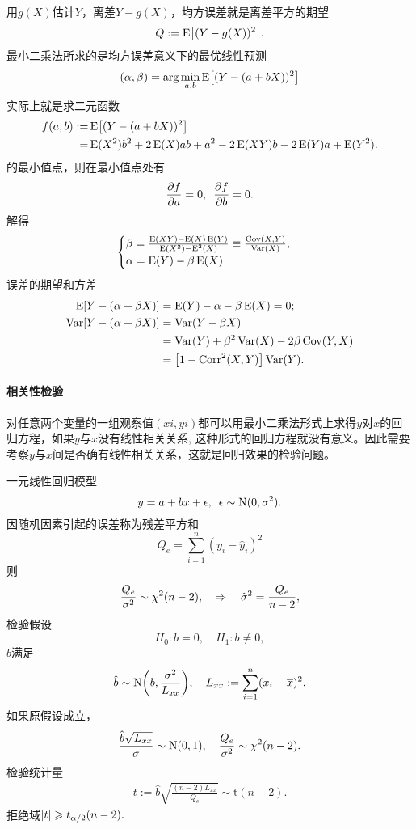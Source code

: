 用$g(X)$估计$Y$，离差$Y-g(X)$，均方误差就是离差平方的期望
\[
	Q:=\operatorname{E}\bigl[(Y-g(X))^2\bigr].
\]
最小二乘法所求的是均方误差意义下的最优线性预测
\[
	(\alpha,\beta)=\arg\min_{a,b}\operatorname{E}\bigl[(Y-(a+bX))^2\bigr]
\]
实际上就是求二元函数
\begin{align*}
	f(a,b):=&{}\operatorname{E}\bigl[(Y-(a+bX))^2\bigr]\\
	=&{}\operatorname{E}(X^2)b^2+2\operatorname{E}(X)ab+a^2-2\operatorname{E}(XY)b-2\operatorname{E}(Y)a+\operatorname{E}(Y^2).
\end{align*}
的最小值点，则在最小值点处有
\[
	\pv fa=0,\enspace\pv fb=0.
\]
解得
\begin{align}
	\begin{cases}
		\beta=\frac{\operatorname{E}(XY)-\operatorname{E}(X)\operatorname{E}(Y)}{\operatorname{E}(X^2)-\operatorname{E}^2(X)}\equiv\frac{\operatorname{Cov}(X,Y)}{\operatorname{Var}(X)},\\
		\alpha=\operatorname{E}(Y)-\beta\operatorname{E}(X)
	\end{cases}
\end{align}
误差的期望和方差
\begin{align*}
	\E[Y-(\alpha+\beta X)]&=\E(Y)-\alpha-\beta\E(X)=0;\\
	\Var[Y-(\alpha+\beta X)]&=\Var(Y-\beta X)\\
	&=\Var(Y)+\beta^2\Var(X)-2\beta\Cov(Y,X)\\
	&=%
	\bigfkh{1-\Corr^2(X,Y)}\Var(Y).
\end{align*}
\paragraph{相关性检验}
对任意两个变量的一组观察值$ {(xi, yi)} $都可以用最小二乘法形式上求得$ y$对$ x $的回归方程，如果$ y $与$ x $没有线性相关关系, 这种形式的回归方程就没有意义。因此需要考察$ y $与$ x $间是否确有线性相关关系，这就是回归效果的检验问题。

一元线性回归模型
\[
	y=a+bx+\epsilon,\enspace\epsilon\sim\operatorname{N}(0,\sigma^2).
\]
因随机因素引起的误差称为残差平方和
\[
	Q_e=\sum_{i=1}^n(y_i-\hat y_i)^2
\]
则
\[
	\frac{Q_e}{\sigma^2}\sim\chi^2(n-2),\quad\Rightarrow\quad\hat\sigma^2=\frac{Q_e}{n-2},
\]
检验假设 
\[
	H_0:b=0,\quad H_1:b\neq 0,
\]
$\hat b$满足 
\[
	\hat b\sim\operatorname{N}\biggl(b,\frac{\sigma^2}{L_{xx}}\biggr),\quad L_{xx}:=\sum_{i=1}^n(x_i-\overline x)^2.
\]
如果原假设成立，
\[
	\frac{\hat b\sqrt{L_{xx}}}{\sigma}\sim\operatorname{N}(0,1),\quad\frac{Q_e}{\sigma^2}\sim\chi^2(n-2).
\]
检验统计量 
\begin{align}
	t:=\hat b\sqrt{\frac{(n-2)L_{xx}}{Q_e}}\sim\mathrm t(n-2).
\end{align}
拒绝域$\left\lvert t\right\rvert\geqslant t_{\alpha/2}(n-2).$
